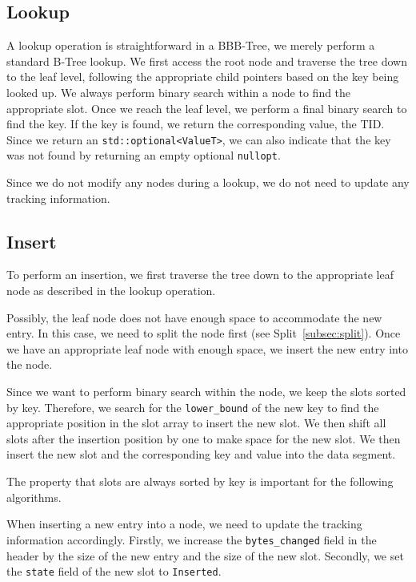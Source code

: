 \subsection*{Lookup}
A lookup operation is straightforward in a BBB-Tree, we merely perform a standard B-Tree lookup.
We first access the root node and traverse the tree down to the leaf level, following the appropriate child pointers based on the key being looked up.
We always perform binary search within a node to find the appropriate slot. 
Once we reach the leaf level, we perform a final binary search to find the key.
If the key is found, we return the corresponding value, the \ac{TID}.
Since we return an \texttt{std::optional<ValueT>}, we can also indicate that the key was not found by returning an empty optional \texttt{nullopt}.

Since we do not modify any nodes during a lookup, we do not need to update any tracking information.

\subsection*{Insert}
To perform an insertion, we first traverse the tree down to the appropriate leaf node as described in the lookup operation.

Possibly, the leaf node does not have enough space to accommodate the new entry.
In this case, we need to split the node first (see Split~\ref{subsec:split}).
Once we have an appropriate leaf node with enough space, we insert the new entry into the node.

Since we want to perform binary search within the node, we keep the slots sorted by key.
Therefore, we search for the \texttt{lower\_bound} of the new key to find the appropriate position in the slot array to insert the new slot.
We then shift all slots after the insertion position by one to make space for the new slot.
We then insert the new slot and the corresponding key and value into the data segment.

The property that slots are always sorted by key is important for the following algorithms.

When inserting a new entry into a node, we need to update the tracking information accordingly.
Firstly, we increase the \texttt{bytes\_changed} field in the header by the size of the new entry and the size of the new slot.
Secondly, we set the \texttt{state} field of the new slot to \texttt{Inserted}.

